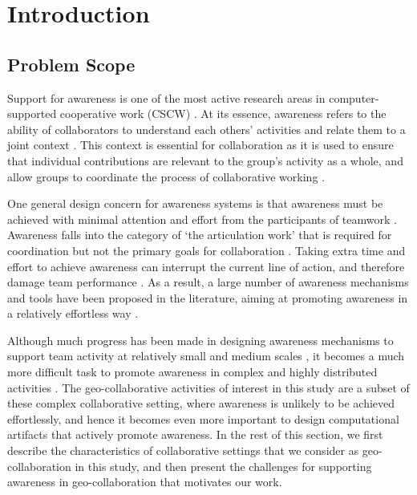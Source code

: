 \graphicspath{{Figures/}}

\chapter{Introduction} 
\label{chapter1:introduction}

\section{Problem Scope}
Support for awareness is one of the most active research areas in computer-supported cooperative work (CSCW) \cite{dourish1992awareness,schmidt2002a,rittenbruch2009a}. At its essence, awareness refers to the ability of collaborators to understand each others' activities and relate them to a joint context \cite{rittenbruch2009a}. This context is essential for collaboration as it is used to ensure that individual contributions are relevant to the group’s activity as a whole, and allow groups to coordinate the process of collaborative working \cite{dourish1992awareness}.  

One general design concern for awareness systems is that awareness must be achieved with minimal attention and effort from the participants of teamwork \cite{markopoulos2009design}. Awareness falls into the category of `the articulation work' that is required for coordination but not the primary goals for collaboration  \cite{schmidt1992a}. Taking extra time and effort to achieve awareness can interrupt the current line of action, and therefore damage team performance \cite{fussell1998coordination}. As a result, a large number of awareness mechanisms and tools have been proposed in the literature, aiming at promoting awareness in a relatively effortless way \cite{rittenbruch2009a}.

Although much progress has been made in designing awareness mechanisms to support team activity at relatively small and medium scales \cite{antunes2010a}, it becomes a much more difficult task to promote awareness in complex and highly distributed activities \cite{cabitza2009promoting}. The geo-collaborative activities of interest in this study are a subset of these complex collaborative setting, where awareness is unlikely to be achieved effortlessly, and hence it becomes even more important to design computational artifacts that actively promote awareness. In the rest of this section, we first describe the characteristics of collaborative settings that we consider as geo-collaboration in this study, and then present the challenges for supporting awareness in geo-collaboration that motivates our work.

